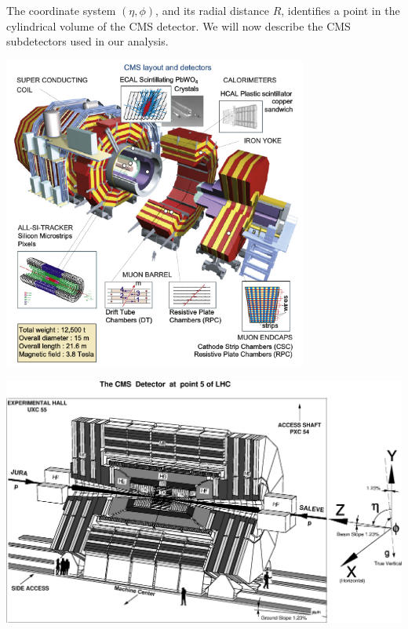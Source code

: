 The coordinate system $(\eta, \phi)$, and its radial distance $R$, identifies a point in the cylindrical volume of the CMS detector. We will now describe the CMS subdetectors used in our analysis.
\begin{center}
\centering
\mbox{\includegraphics[width=10cm]{THESISPLOTS/CMS_LAYOUT_AND_DETECTORS.png}} 
\label{fig:CMS-DET}
\end{center}

\begin{center}
\centering
\mbox{\includegraphics[scale=0.5]{THESISPLOTS/CMS_DETECTOR.eps}} 
\label{fig:CMSDCORD}
\end{center}

